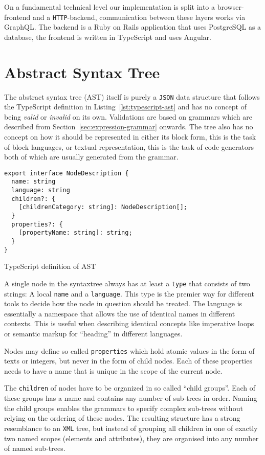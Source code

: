 \documentclass[sigconf,natbib=false]{acmart}
\begin{document}
On a fundamental technical level our implementation is split into a browser-frontend and a \texttt{HTTP}-backend, communication between these layers works via GraphQL. The backend is a Ruby on Rails application that uses PostgreSQL as a database, the frontend is written in TypeScript and uses Angular.

\section{Abstract Syntax Tree}
\label{sec:abstract-syntax-tree}

The abstract syntax tree (AST) itself is purely a \texttt{JSON} data structure that follows the TypeScript definition in Listing~\ref{lst:typescript-ast} and has no concept of being \textit{valid} or \textit{invalid} on its own. Validations are based on grammars which are described from Section~\ref{sec:expression-grammar} onwards. The tree also has no concept on how it should be represented in either its block form, this is the task of block languages, or textual representation, this is the task of code generators both of which are usually generated from the grammar.

\begin{listing}[H]
\begin{verbatim}
export interface NodeDescription {
  name: string
  language: string
  children?: {
    [childrenCategory: string]: NodeDescription[];
  }
  properties?: {
    [propertyName: string]: string;
  }
}
\end{verbatim}
\caption{TypeScript definition of AST}
\label{lst:typescript-ast}
\end{listing}

A single node in the syntaxtree always has at least a \texttt{type} that consists of two strings: A local \texttt{name} and a \texttt{language}. This type is the premier way for different tools to decide how the node in question should be treated. The language is essentially a namespace that allows the use of identical names in different contexts. This is useful when describing identical concepts like imperative loops or semantic markup for \enquote{heading} in different languages.

Nodes may define so called \texttt{properties} which hold atomic values in the form of texts or integers, but never in the form of child nodes. Each of these properties needs to have a name that is unique in the scope of the current node.

The \texttt{children} of nodes have to be organized in so called \enquote{child groups}. Each of these groups has a name and contains any number of sub-trees in order. Naming the child groups enables the grammars to specify complex sub-trees without relying on the ordering of these nodes. The resulting structure has a strong resemblance to an \texttt{XML} tree, but instead of grouping all children in one of exactly two named scopes (elements and attributes), they are organised into any number of named sub-trees.
\end{document}
